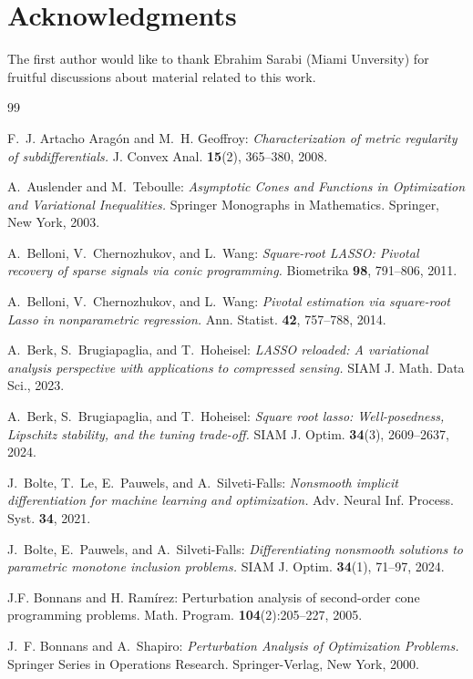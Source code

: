 \documentclass[reqno]{amsart}
\numberwithin{equation}{section}
\begin{document}
\section*{Acknowledgments} The first author would like to thank Ebrahim Sarabi (Miami Unversity) for fruitful discussions about material related to this work. 

\begin{thebibliography}{99}

{\sc F.~J. Artacho Arag\'on and M.~H. Geoffroy:}
{\em Characterization of metric regularity of subdifferentials.}
J. Convex Anal. {\bf 15}(2), 365--380, 2008.

{\sc A.~Auslender and M.~Teboulle:}
{\em Asymptotic Cones and Functions in Optimization and Variational Inequalities.}
Springer Monographs in Mathematics. Springer, New York, 2003.

{\sc A.~Belloni, V.~Chernozhukov, and L.~Wang:}
{\em Square-root LASSO: Pivotal recovery of sparse signals via conic programming.}
Biometrika {\bf 98}, 791--806, 2011.

{\sc A.~Belloni, V.~Chernozhukov, and L.~Wang:}
{\em Pivotal estimation via square-root Lasso in nonparametric regression.}
Ann. Statist. {\bf 42}, 757--788, 2014.

{\sc A.~Berk, S.~Brugiapaglia, and T.~Hoheisel:}
{\em LASSO reloaded: A variational analysis perspective with applications to compressed sensing.}
SIAM J. Math. Data Sci., 2023.

{\sc A.~Berk, S.~Brugiapaglia, and T.~Hoheisel:}
{\em Square root lasso: Well-posedness, Lipschitz stability, and the tuning trade-off.}
SIAM J. Optim. {\bf 34}(3), 2609--2637, 2024.

{\sc J.~Bolte, T.~Le, E.~Pauwels, and A.~Silveti-Falls:}
{\em Nonsmooth implicit differentiation for machine learning and optimization.}
Adv. Neural Inf. Process. Syst. {\bf 34}, 2021.

{\sc J.~Bolte, E.~Pauwels, and A.~Silveti-Falls:}
{\em Differentiating nonsmooth solutions to parametric monotone inclusion problems.}
SIAM J. Optim. {\bf 34}(1), 71--97, 2024.


 {\sc J.F.  Bonnans and H. Ram\'irez:}  Perturbation analysis of second-order cone programming problems. Math. Program. 
 {\bf 104}(2):205--227, 2005. 

{\sc J.~F. Bonnans and A.~Shapiro:}
{\em Perturbation Analysis of Optimization Problems.}
Springer Series in Operations Research. Springer-Verlag, New York, 2000.


\end{thebibliography}
\end{document}
